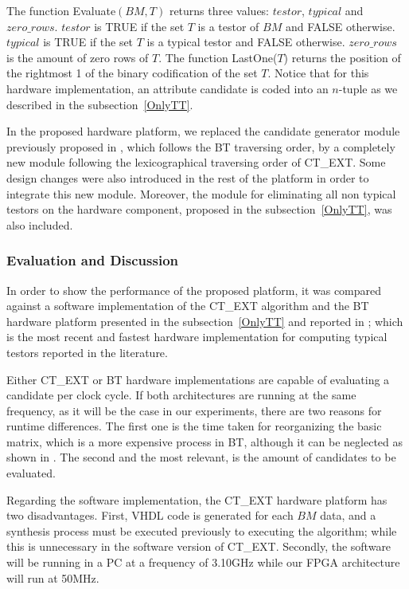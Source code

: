 \documentclass[authoryear,11pt]{elsarticle}
\begin{document}
	The function Evaluate$(BM,T)$ returns three values: $testor$, $typical$ and $zero\_rows$. $testor$ is 
	TRUE if the set $T$ is a testor of $BM$ and FALSE otherwise. $typical$ is TRUE if the set $T$ is a
	typical testor and FALSE otherwise. $zero\_rows$ is the amount of zero rows of $T$. The function
	LastOne($T$) returns the position of the rightmost 1 of the binary codification of the set $T$. Notice 
	that for this hardware implementation, an attribute candidate is coded into an $n$-tuple as we described 
	in the subsection~\ref{OnlyTT}.
	
	In the proposed hardware platform, we replaced the candidate generator module previously proposed in
	\citep{Rodriguez14}, which follows the BT traversing order, by a completely new module following the
	lexicographical traversing order of CT\_EXT. Some design changes were also introduced in the rest of 
	the platform in order to integrate this new module. Moreover, the module for eliminating all non typical
	testors on the hardware component, proposed in the subsection~\ref{OnlyTT}, was also included.
	
\subsubsection{Evaluation and Discussion}\label{subsect:CTEXT_eval}
	In order to show the performance of the proposed platform, it was compared against a software 
	implementation of the CT\_EXT algorithm \citep{Sanchez07} and the BT hardware platform presented in the 
	subsection~\ref{OnlyTT} and reported in \citep{Rodriguez14}; which is the most recent and fastest hardware
	implementation for computing typical	testors reported in the literature.
	
	Either CT\_EXT or BT hardware implementations are capable of evaluating a candidate per clock 
	cycle. If both architectures are running at the same frequency, as it will be the case in our experiments, 
	there are two reasons for runtime differences. The first one is the time taken for reorganizing 
	the basic matrix, which is a more expensive process in BT, although it can be neglected as shown in
	\citep{Rojas12}. The second and the most relevant, is the amount of candidates to be evaluated. 
	
	Regarding the software implementation, the CT\_EXT hardware platform has two disadvantages. First, 
	VHDL code is generated for each $BM$ data, and a synthesis process must be executed previously to 
	executing the algorithm; while this is unnecessary in the software version of CT\_EXT. Secondly, the 
	software will be running in a PC at a frequency of 3.10GHz while our FPGA architecture will run at 50MHz. 
	
\end{document}

